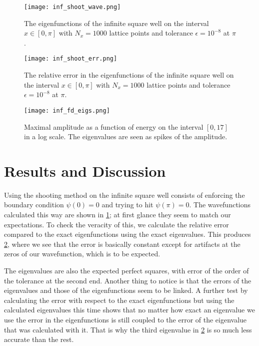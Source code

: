 \documentclass[10pt,a4paper,twocolumn]{article}
\begin{document}
\begin{figure}
    \centering
    \captionsetup{justification=centering}
    \texttt{[image: inf\_shoot\_wave.png]}
    \caption{The eigenfunctions of the infinite square well on the interval $x \in [0, \pi]$ with $N_x = 1000$ lattice points and tolerance $\epsilon = 10^{-8}$ at $\pi$.}
    \label{fig:inf_shoot_wave}
\end{figure}

\begin{figure}
    \centering
    \captionsetup{justification=centering}
    \texttt{[image: inf\_shoot\_err.png]}
    \caption{The relative error in the eigenfunctions of the infinite square well on the interval $x \in [0, \pi]$ with $N_x = 1000$ lattice points and tolerance $\epsilon = 10^{-8}$ at $\pi$.}
    \label{fig:inf_shoot_err}
\end{figure}

\begin{figure}
    \centering
    \captionsetup{justification=centering}
    \texttt{[image: inf\_fd\_eigs.png]}
    \caption{Maximal amplitude as a function of energy on the interval $[0,17]$ in a log scale. The eigenvalues are seen as spikes of the amplitude.}
    \label{fig:inf_fd_eigs}
\end{figure}


\section{Results and Discussion}

Using the shooting method on the infinite square well consists of enforcing the boundary condition $\psi(0) = 0$ and trying to hit $\psi(\pi) = 0$. The wavefunctions calculated this way are shown in \cref{fig:inf_shoot_wave}; at first glance they seem to match our expectations. To check the veracity of this, we calculate the relative error compared to the exact eigenfunctions using the exact eigenvalues. This produces \cref{fig:inf_shoot_err}, where we see that the error is basically constant except for artifacts at the zeros of our wavefunction, which is to be expected.

The eigenvalues are also the expected perfect squares, with error of the order of the tolerance at the second end. Another thing to notice is that the errors of the eigenvalues and those of the eigenfunctions seem to be linked. A further test by calculating the error with respect to the exact eigenfunctions but using the calculated eigenvalues this time shows that no matter how exact an eigenvalue we use the error in the eigenfunctions is still coupled to the error of the eigenvalue that was calculated with it. That is why the third eigenvalue in \cref{fig:inf_shoot_err} is so much less accurate than the rest.
\end{document}
